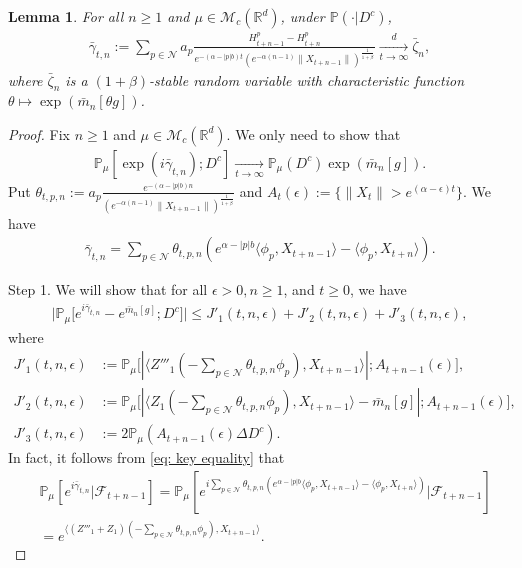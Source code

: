 \documentclass[12pt,a4paper]{amsart}
\theoremstyle{plain}
\newtheorem{lem}[thm]{Lemma}
\theoremstyle{definition}
\numberwithin{equation}{section}
\begin{document}
\begin{lem}\label{large-central}
    For all $n\ge 1$ and $\mu\in\mathcal{M}_c(\mathbb{R}^d)$, under $\mathbb{P}(\cdot|D^c)$,
\begin{align}
    \bar{\gamma}_{t,n}:=\sum_{p\in\mathcal{N}}a_p\frac{H^p_{t+n-1}-H^p_{t+n}}{e^{-(\alpha-|p|b)t}(e^{-\alpha(n-1)}\|X_{t+n-1}\|)^{\frac{1}{1+\beta}}}
    \xrightarrow[t\to \infty]{d}\bar{\zeta}_n,
\end{align}
	where $\bar{\zeta}_n$ is a $(1+\beta)$-stable random variable with
    characteristic function
$\theta\mapsto \exp(\bar{m}_n[\theta g])$.
\end{lem}
\begin{proof}
    Fix $n\ge 1$ and $\mu\in\mathcal{M}_c(\mathbb{R}^d)$.
    We only need to show that
\begin{align}
    \mathbb{P}_{\mu}[\exp(i\bar{\gamma}_{t,n}); D^c]
    \xrightarrow[t\rightarrow \infty]{}\mathbb{P}_{\mu}(D^c)\exp(\bar{m}_n[g]).
\end{align}
    Put $\theta_{t,p,n}:=a_p\frac{e^{-(\alpha-|p|b)n}}{(e^{-\alpha(n-1)}\|X_{t+n-1}\|)^{\frac{1}{1+\beta}}}$ and
    $A_t(\epsilon):=\{\|X_t\| > e^{(\alpha-\epsilon)t}\}$.
    We have
\begin{align}
    \bar{\gamma}_{t,n}=\sum_{p\in \mathcal{N}}\theta_{t,p,n}(e^{\alpha-|p|b}\langle \phi_p, X_{t+n-1}\rangle-\langle \phi_p, X_{t+n}\rangle).
\end{align}

	Step 1. We will show that for all $\epsilon > 0, n\geq 1$, and $t\geq 0$, we have
\begin{align}
    \big|\mathbb{P}_{\mu}\big[e^{i\bar{\gamma}_{t,n}}-e^{\bar{m}_n[g]}; D^c\big]\big|
    \leq J'_1(t,n,\epsilon)+J'_2(t,n,\epsilon)+J'_3(t,n,\epsilon),
\end{align}
	where
\begin{align}
\label{eq: Def of JJ1}
	J'_1(t,n,\epsilon)
    &:= \mathbb{P}_{\mu}\big[|\langle Z'''_1(-\sum_{p\in \mathcal{N}}\theta_{t,p,n}\phi_p), X_{t+n-1}\rangle|; A_{t+n-1}(\epsilon) \big],
	\\ J'_2(t,n,\epsilon)
	&:= \mathbb{P}_{\mu}\big[|\langle Z_1(-\sum_{p\in \mathcal{N}}\theta_{t,p,n}\phi_p),X_{t+n-1}\rangle-\bar{m}_n[g]|; A_{t+n-1}(\epsilon)\big],
	\\ J'_3(t,n, \epsilon)
	&:=2\mathbb{P}_{\mu}(A_{t+n-1}(\epsilon)\Delta D^c).
\end{align}
    In fact, it follows from \eqref{eq: key equality} that
\begin{align}
\label{eq: need11}
    &\displaystyle\mathbb{P}_{\mu}[e^{i\bar{\gamma}_{t,n}}|\mathscr{F}_{t+n-1}]
    =\mathbb{P}_{\mu}[e^{i\sum_{p\in \mathcal{N}}\theta_{t,p,n}(e^{\alpha-|p|b}\langle \phi_p,X_{t+n-1}\rangle-\langle \phi_p, X_{t+n}\rangle)}|\mathscr{F}_{t+n-1}]
    \\&=\displaystyle e^{\langle (Z'''_1+Z_1)(-\sum_{p\in \mathcal{N}}\theta_{t,p,n}\phi_p), X_{t+n-1} \rangle}.
\end{align}


\end{proof}
\end{document}
